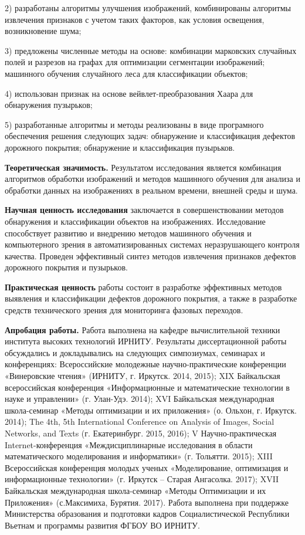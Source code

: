 2) разработаны алгоритмы улучшения изображений, комбинированы алгоритмы извлечения признаков с учетом таких факторов, как условия освещения, возникновение шума;

3) предложены численные методы на основе: комбинации марковских случайных полей и разрезов на графах для оптимизации сегментации изображений; машинного обучения случайного леса для классификации объектов;

4) использован признак на основе вейвлет-преобразования Хаара для обнаружения пузырьков;

5) разработанные алгоритмы и методы реализованы в виде програмного обеспечения решения следующих задач: обнаружение и классификация дефектов дорожного покрытия; обнаружение и классификация пузырьков.

\textbf{Теоретическая значимость.} Результатом исследования является комбинация алгоритмов обработки изображений и методов машинного обучения для анализа и обработки данных на изображениях в реальном времени, внешней среды и шума. 
 

\textbf{Научная ценность исследования} заключается в совершенствовании методов обнаружения и классификации объектов на изображениях. Исследование способствует развитию и внедрению методов машинного обучения и компьютерного зрения в автоматизированных системах неразрушающего контроля качества. Проведен эффективный синтез методов извлечения признаков дефектов дорожного покрытия и пузырьков.

\textbf{Практическая ценность} работы состоит в разработке эффективных методов выявления и классификации дефектов дорожного покрытия, а также в разработке средств технического зрения для мониторинга фазовых переходов.

\textbf{Апробация работы.} Работа выполнена на кафедре вычислительной техники института высоких технологий ИРНИТУ. Результаты диссертационной работы обсуждались и докладывались на следующих симпозиумах, семинарах и конференциях: Всероссийские молодежные научно-практические конференции «Винеровские чтения» (ИРНИТУ, г. Иркутск. 2014, 2015); XIX Байкальская всероссийская конференция «Информационные и математические технологии в науке и управлении» (г. Улан-Удэ. 2014); XVI Байкальская международная школа-семинар «Методы оптимизации и их приложения» (о. Ольхон, г. Иркутск. 2014); The 4th, 5th International Conference on Analysis of Images, Social Networks, and Texts (г. Екатеринбург. 2015, 2016); V Научно-практическая Internet-конференция «Междисциплинарные исследования в области математического моделирования и информатики» (г. Тольятти. 2015); XIII Всероссийская конференция молодых ученых «Моделирование, оптимизация и информационные технологии» (г. Иркутск – Старая Ангасолка. 2017); XVII Байкальская международная школа-семинар «Методы Оптимизации и их Приложения» (с.Максимиха, Бурятия. 2017). Работа выполнена при поддержке Министерства образования и подготовки кадров Социалистической Республики Вьетнам и программы развития ФГБОУ ВО ИРНИТУ.


